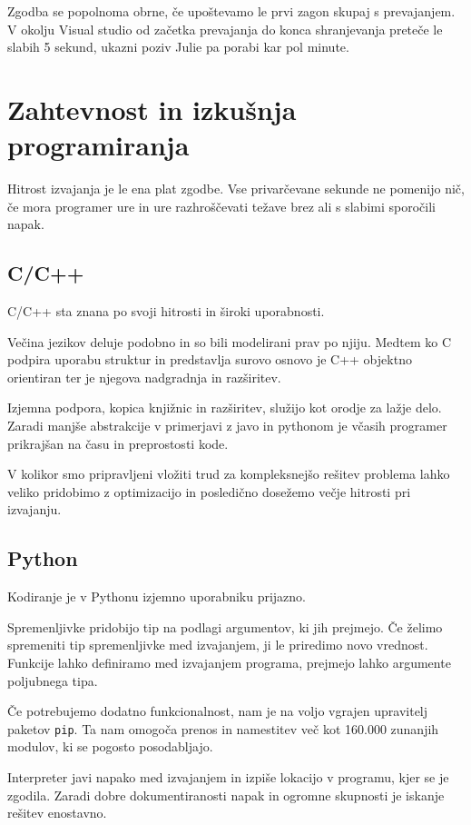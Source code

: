 \documentclass[journal,a4paper,twoside]{sty/IEEEtran}
\begin{document}
Zgodba se popolnoma obrne, če upoštevamo le prvi zagon skupaj s prevajanjem.
V okolju Visual studio od začetka prevajanja do konca shranjevanja preteče le slabih 5 sekund, ukazni poziv Julie pa porabi kar pol minute.

\section{Zahtevnost in izkušnja programiranja}

Hitrost izvajanja je le ena plat zgodbe.
Vse privarčevane sekunde ne pomenijo nič, če mora programer ure in ure razhroščevati težave brez ali s slabimi sporočili napak.

\subsection{C/C++}

C/C++ sta znana po svoji hitrosti in široki uporabnosti.

Večina jezikov deluje podobno in so bili modelirani prav po njiju.
Medtem ko C podpira uporabu struktur in predstavlja surovo osnovo je C++ objektno orientiran ter je
njegova nadgradnja in razširitev. 

Izjemna podpora, kopica knjižnic in razširitev, služijo kot orodje za lažje delo.
Zaradi manjše abstrakcije v primerjavi z javo in pythonom je včasih programer prikrajšan 
na času in preprostosti kode.

V kolikor smo pripravljeni vložiti trud za kompleksnejšo rešitev problema lahko veliko pridobimo z optimizacijo
in posledično dosežemo večje hitrosti pri izvajanju.

\subsection{Python}

Kodiranje je v Pythonu izjemno uporabniku prijazno.

Spremenljivke pridobijo tip na podlagi argumentov, ki jih prejmejo.
Če želimo spremeniti tip spremenljivke med izvajanjem, ji le priredimo novo vrednost.
Funkcije lahko definiramo med izvajanjem programa, prejmejo lahko argumente poljubnega tipa.

Če potrebujemo dodatno funkcionalnost, nam je na voljo vgrajen upravitelj paketov \texttt{pip}.
Ta nam omogoča prenos in namestitev več kot 160.000 zunanjih modulov, ki se pogosto posodabljajo.

Interpreter javi napako med izvajanjem in izpiše lokacijo v programu, kjer se je zgodila.
Zaradi dobre dokumentiranosti napak in ogromne skupnosti je iskanje rešitev enostavno.
\end{document}

